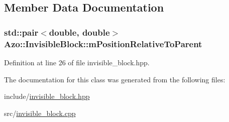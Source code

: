 \subsection{Member Data Documentation}
\subsubsection[{\texorpdfstring{m\+Position\+Relative\+To\+Parent}{mPositionRelativeToParent}}]{\setlength{\rightskip}{0pt plus 5cm}std\+::pair$<$double, double$>$ Azo\+::\+Invisible\+Block\+::m\+Position\+Relative\+To\+Parent}\hypertarget{class_azo_1_1_invisible_block_aa761a24addda645a72ecc5b8db29095d}{}\label{class_azo_1_1_invisible_block_aa761a24addda645a72ecc5b8db29095d}


Definition at line 26 of file invisible\+\_\+block.\+hpp.



The documentation for this class was generated from the following files\+:\begin{DoxyCompactItemize}
\item 
include/\hyperlink{invisible__block_8hpp}{invisible\+\_\+block.\+hpp}\item 
src/\hyperlink{invisible__block_8cpp}{invisible\+\_\+block.\+cpp}\end{DoxyCompactItemize}
